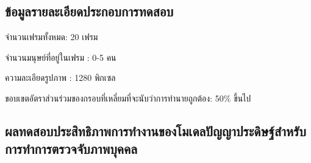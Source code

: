 \subsection{ข้อมูลรายละเอียดประกอบการทดสอบ}
จำนวนเฟรมทั้งหมด: 20 เฟรม

จำนวนมนุษย์ที่อยู่ในเฟรม : 0-5 คน

ความละเอียดรูปภาพ : 1280 พิกเซล

ขอบเขตอัตราส่วนร่วมของกรอบที่เหลี่ยมที่จะนับว่าการทำนายถูกต้อง: 50\% ขึ้นไป


\subsection{ผลทดสอบประสิทธิภาพการทำงานของโมเดลปัญญาประดิษฐ์สำหรับการทำการตรวจจับภาพบุคคล}

